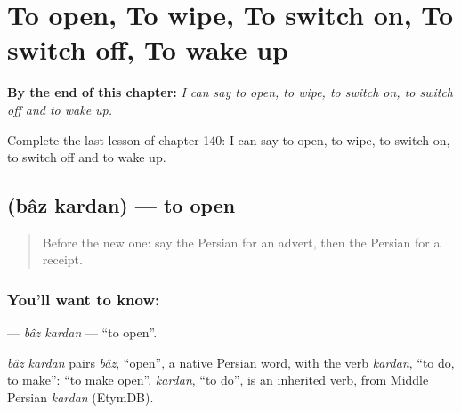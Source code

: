 
\chapter{To open, To wipe, To switch on, To switch off, To wake up}
\label{ch:fa-to-open-to-wipe-to-switch-on-to-switch-off-to-wake-up}

\begin{chapteropening}
\textbf{By the end of this chapter:} \emph{I can say to open, to wipe, to switch on, to switch off and to wake up.}

Complete the last lesson of chapter 140: I can say to open, to wipe, to switch on, to switch off and to wake up.
\end{chapteropening}

\section[\texorpdfstring{\fa{باز} \fa{کردن} (bâz kardan)}{باز کردن (bâz kardan)}]{  (bâz kardan) — to open}

\label{lesson:FA-C140-baz-kardan}



\begin{quote}
Before the new one: say the Persian for an advert, then the Persian for a receipt.
\end{quote}

\subsection*{You'll want to know:  }
\textbf{ } — \emph{bâz kardan} — \textquotedblleft{}to open\textquotedblright{}.

\begin{cousinweb}
\emph{bâz kardan} pairs \emph{bâz}, \textquotedblleft{}open\textquotedblright{}, a native Persian word, with the verb \emph{kardan}, \textquotedblleft{}to do, to make\textquotedblright{}: \textquotedblleft{}to make open\textquotedblright{}. \emph{kardan}, \textquotedblleft{}to do\textquotedblright{}, is an inherited verb, from Middle Persian \emph{kardan} (EtymDB).
\end{cousinweb}

